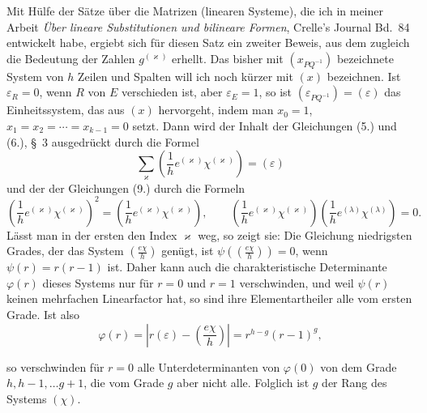 \documentclass[11pt]{article}
\begin{document}
Mit Hülfe der Sätze über die Matrizen (linearen Systeme), die ich in meiner Arbeit \emph{Über lineare Substitutionen und bilineare Formen}, Crelle's Journal Bd.~84 entwickelt habe, ergiebt sich für diesen Satz ein zweiter Beweis, aus dem zugleich die Bedeutung der Zahlen $g^{(\varkappa)}$ erhellt. Das bisher mit $(x_{PQ^{-1}})$ bezeichnete System von $h$ Zeilen und Spalten will ich noch kürzer mit $(x)$ bezeichnen. Ist $\varepsilon_R=0$, wenn $R$ von $E$ verschieden ist, aber $\varepsilon_E=1$, so ist $(\varepsilon_{PQ^{-1}})=(\varepsilon)$ das Einheitssystem, das aus $(x)$ hervorgeht, indem man $x_0=1$, $x_1=x_2=\cdots=x_{k-1}=0$ setzt. Dann wird der Inhalt der Gleichungen (5.) und (6.), \S~3 ausgedrückt durch die Formel
\begin{equation*}\tag{23.}
\sum_\varkappa\left(\frac{1}{h}e^{(\varkappa)}\chi^{(\varkappa)}\right)=(\varepsilon)
\end{equation*}
und der der Gleichungen (9.) durch die Formeln
\begin{equation*}\tag{24.}
\left(\frac{1}{h}e^{(\varkappa)}\chi^{(\varkappa)}\right)^2=\left(\frac{1}{h}e^{(\varkappa)}\chi^{(\varkappa)}\right),
\qquad
\left(\frac{1}{h}e^{(\varkappa)}\chi^{(\varkappa)}\right)\left(\frac{1}{h}e^{(\lambda)}\chi^{(\lambda)}\right)=0.
\end{equation*}
Lässt man in der ersten den Index $\varkappa$ weg, so zeigt sie: Die Gleichung niedrigsten Grades, der das System $\left(\frac{e\chi}{h}\right)$ genügt, ist $\psi\left(\left(\frac{e\chi}{h}\right)\right)=0$, wenn $\psi(r)=r(r-1)$ ist. Daher kann auch die charakteristische Determinante $\varphi(r)$ dieses Systems nur für $r=0$ und $r=1$ verschwinden, und weil $\psi(r)$ keinen mehrfachen Linearfactor hat, so sind ihre Elementartheiler alle vom ersten Grade. Ist also
\begin{equation*}\tag{25.}
\varphi(r)=\left|r(\varepsilon)-\left(\frac{e\chi}{h}\right)\right|=r^{h-g}(r-1)^g,
\end{equation*}


so verschwinden für $r=0$ alle Unterdeterminanten von $\varphi(0)$ von dem Grade $h,h-1,\ldots g+1$, die vom Grade $g$ aber nicht alle. Folglich ist $g$ der Rang des Systems $(\chi)$.
\end{document}
